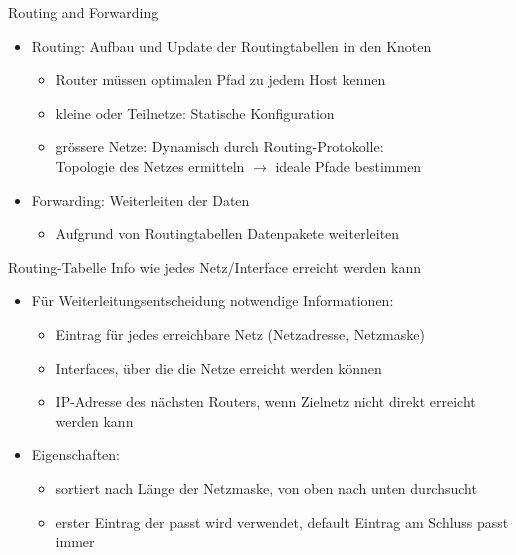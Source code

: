\begin{concept}{Routing and Forwarding}
    \begin{itemize}
        \item Routing: Aufbau und Update der Routingtabellen in den Knoten
            \begin{itemize}
                \item Router müssen optimalen Pfad zu jedem Host kennen
                \item kleine oder Teilnetze: Statische Konfiguration
                \item grössere Netze: Dynamisch durch Routing-Protokolle: \\ Topologie des Netzes ermitteln $\rightarrow$ ideale Pfade bestimmen
            \end{itemize}
        \item Forwarding: Weiterleiten der Daten
        \begin{itemize}
            \item Aufgrund von Routingtabellen Datenpakete weiterleiten
        \end{itemize}
    \end{itemize}
\end{concept}

\begin{definition}{Routing-Tabelle} Info wie jedes Netz/Interface erreicht werden kann
    
    \begin{itemize}
        \item Für Weiterleitungsentscheidung notwendige Informationen:
        \begin{itemize}
            \item Eintrag für jedes erreichbare Netz (Netzadresse, Netzmaske)
            \item Interfaces, über die die Netze erreicht werden können
            \item IP-Adresse des nächsten Routers, wenn Zielnetz nicht direkt erreicht werden kann
        \end{itemize}
        \item Eigenschaften:
        \begin{itemize}
            \item sortiert nach Länge der Netzmaske, von oben nach unten durchsucht
            \item erster Eintrag der passt wird verwendet, default Eintrag am Schluss passt immer
        \end{itemize}        
    \end{itemize}
\end{definition}

